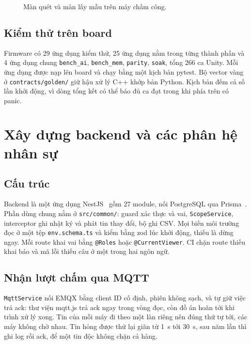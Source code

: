 \documentclass[../DoAn.tex]{subfiles}
\begin{document}
\begin{figure}[!htb]
\centering
{}
\hspace{4mm}
\caption{Màn quét và màn lấy mẫu trên máy chấm công.}
\label{fig:man_may}
\end{figure}

\subsection{Kiểm thử trên board}
\label{section:4.4.7}

Firmware có 29 ứng dụng kiểm thử, 25 ứng dụng nằm trong từng thành phần và 4 ứng dụng chung
\texttt{bench\_ai}, \texttt{bench\_mem}, \texttt{parity}, \texttt{soak}, tổng 266 ca Unity. Mỗi ứng dụng được
nạp lên board và chạy bằng một kịch bản pytest. Bộ vector vàng ở \texttt{contracts/golden/} giữ hậu xử lý C++
khớp bản Python. Kịch bản đếm cả số lần khởi động, vì dòng tổng kết có thể báo đủ ca đạt trong khi phía trên có panic.

\section{Xây dựng backend và các phân hệ nhân sự}
\label{section:4.5}

\subsection{Cấu trúc}
\label{section:4.5.1}

Backend là một ứng dụng NestJS~\cite{nestjs} gồm 27 module, nối PostgreSQL qua Prisma~\cite{prisma}. Phần dùng
chung nằm ở \texttt{src/common/}: guard xác thực và vai, \texttt{ScopeService}, interceptor ghi nhật ký và phát tin
thay đổi, bộ ghi CSV. Mọi biến môi trường đọc ở một tệp \texttt{env.schema.ts} và kiểm bằng zod lúc khởi động,
thiếu là dừng ngay. Mỗi route khai vai bằng \texttt{@Roles} hoặc \texttt{@CurrentViewer}. CI chặn route thiếu khai báo
và mã lỗi thiếu câu ở một trong hai ngôn ngữ.

\subsection{Nhận lượt chấm qua MQTT}
\label{section:4.5.2}

\texttt{MqttService} nối EMQX bằng client ID cố định, phiên không sạch, và tự giữ việc trả ack: thư viện mqtt.js
trả ack ngay trong vòng đọc, còn đồ án hoãn tới khi trình xử lý xong. Tin của mỗi máy đi theo một làn riêng nên
đúng thứ tự tới, các máy không chờ nhau. Tin hỏng được thử lại giãn từ 1~s tới 30~s, sau năm lần thì ghi log rồi
ack, để một tin độc không chặn cả hàng.
\end{document}
